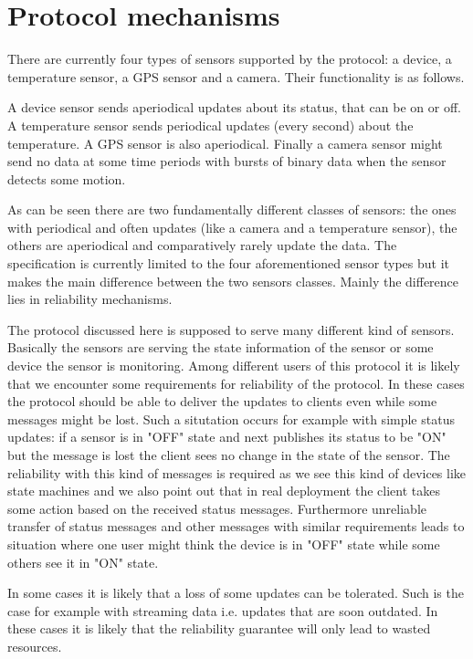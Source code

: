 \chapter{Protocol mechanisms}
There are currently four types of sensors supported by the protocol: a device, a
temperature sensor, a GPS sensor and a camera. Their functionality is as
follows.

A device sensor sends aperiodical updates about its status, that can be on or
off. A temperature sensor sends periodical updates (every second) about the
temperature. A GPS sensor is also aperiodical. Finally a camera sensor might
send no data at some time periods with bursts of binary data when the sensor
detects some motion.

As can be seen there are two fundamentally different classes of sensors: the ones
with periodical and often updates (like a camera and a temperature sensor), the
others are aperiodical and comparatively rarely update the data. The
specification is currently limited to the four aforementioned sensor types but it
makes the main difference between the two sensors classes. Mainly the difference
lies in reliability mechanisms.

The protocol discussed here is supposed to serve many different kind of
sensors. Basically the sensors are serving the state information of the sensor or some device the
sensor is monitoring. Among different users of this protocol it is likely that
we encounter some requirements for reliability of the protocol. In these cases
the protocol should be able to deliver the updates to clients even while some
messages might be lost. Such a situtation occurs for example with simple status
updates: if a sensor is in "OFF" state and next publishes its status to be "ON" but the message is lost the
client sees no change in the state of the sensor. The reliability with this kind
of messages is required as we see this kind of devices like state
machines and we also point out that in real deployment the client takes some action
based on the received status messages. Furthermore unreliable transfer of status
messages and other messages with similar requirements leads to situation where
one user might think the device is in "OFF" state while some others see it in
"ON" state. 

In some cases it is likely that a loss of some updates can be
tolerated. Such is the case for example with streaming data i.e. updates that
are soon outdated. In these cases it is likely that the reliability guarantee
will only lead to wasted resources.

